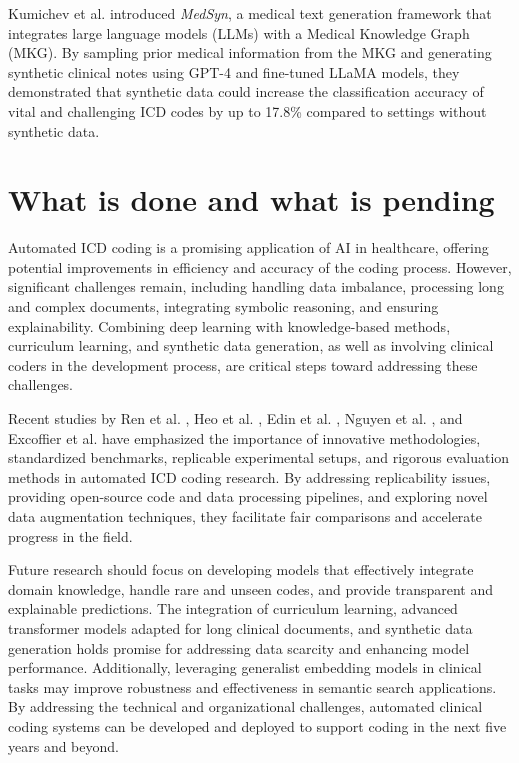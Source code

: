 \documentclass[12pt,a4paper]{report}
\begin{document}
Kumichev et al. \cite{kumichev2024medsyn} introduced \textit{MedSyn}, a medical text generation framework that integrates large language models (LLMs) with a Medical Knowledge Graph (MKG). By sampling prior medical information from the MKG and generating synthetic clinical notes using GPT-4 and fine-tuned LLaMA models, they demonstrated that synthetic data could increase the classification accuracy of vital and challenging ICD codes by up to 17.8\% compared to settings without synthetic data.

\section{What is done and what is pending}

Automated ICD coding is a promising application of AI in healthcare, offering potential improvements in efficiency and accuracy of the coding process. However, significant challenges remain, including handling data imbalance, processing long and complex documents, integrating symbolic reasoning, and ensuring explainability. Combining deep learning with knowledge-based methods, curriculum learning, and synthetic data generation, as well as involving clinical coders in the development process, are critical steps toward addressing these challenges.

Recent studies by Ren et al. \cite{ren2022hicu}, Heo et al. \cite{heo2022medical}, Edin et al. \cite{edin2023automated, edin2024unsupervised}, Nguyen et al. \cite{nguyen2023mimic}, and Excoffier et al. \cite{excoffier2024generalist} have emphasized the importance of innovative methodologies, standardized benchmarks, replicable experimental setups, and rigorous evaluation methods in automated ICD coding research. By addressing replicability issues, providing open-source code and data processing pipelines, and exploring novel data augmentation techniques, they facilitate fair comparisons and accelerate progress in the field.

Future research should focus on developing models that effectively integrate domain knowledge, handle rare and unseen codes, and provide transparent and explainable predictions. The integration of curriculum learning, advanced transformer models adapted for long clinical documents, and synthetic data generation holds promise for addressing data scarcity and enhancing model performance. Additionally, leveraging generalist embedding models in clinical tasks may improve robustness and effectiveness in semantic search applications. By addressing the technical and organizational challenges, automated clinical coding systems can be developed and deployed to support coding in the next five years and beyond.
\end{document}
